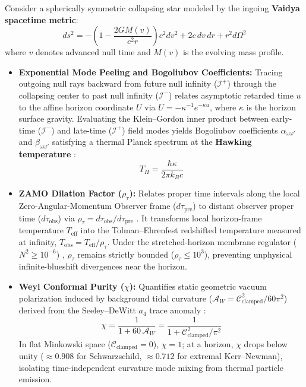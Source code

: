 \documentclass[11pt,a4paper]{article}
\begin{document}
Consider a spherically symmetric collapsing star modeled by the ingoing \textbf{Vaidya spacetime metric}:
\begin{equation}
ds^2 = -\left(1 - \frac{2GM(v)}{c^2 r}\right) c^2 dv^2 + 2c\, dv\, dr + r^2 d\Omega^2
\end{equation}
where $v$ denotes advanced null time and $M(v)$ is the evolving mass profile.

\begin{itemize}
\item \textbf{Exponential Mode Peeling and Bogoliubov Coefficients:} Tracing outgoing null rays backward from future null infinity ($\mathcal{I}^+$) through the collapsing center to past null infinity ($\mathcal{I}^-$) relates asymptotic retarded time $u$ to the affine horizon coordinate $U$ via $U = -\kappa^{-1} e^{-\kappa u}$, where $\kappa$ is the horizon surface gravity. Evaluating the Klein--Gordon inner product between early-time ($\mathcal{I}^-$) and late-time ($\mathcal{I}^+$) field modes yields Bogoliubov coefficients $\alpha_{\omega\omega'}$ and $\beta_{\omega\omega'}$ satisfying a thermal Planck spectrum at the \textbf{Hawking temperature} \cite{Hawking1975}:
\begin{equation}
T_H = \frac{\hbar \kappa}{2\pi k_B c}
\end{equation}

\item \textbf{ZAMO Dilation Factor ($\rho_\tau$):} Relates proper time intervals along the local Zero-Angular-Momentum Observer frame ($d\tau_{\text{pre}}$) to distant observer proper time ($d\tau_{\text{obs}}$) via $\rho_\tau = d\tau_{\text{obs}} / d\tau_{\text{pre}}$ \cite{ADM1962,BPT1972}. It transforms local horizon-frame temperature $T_{\text{eff}}$ into the Tolman--Ehrenfest redshifted temperature measured at infinity, $T_{\text{obs}} = T_{\text{eff}} / \rho_\tau$. Under the stretched-horizon membrane regulator ($N^2 \ge 10^{-6}$) \cite{TPM1986}, $\rho_\tau$ remains strictly bounded ($\rho_\tau \le 10^3$), preventing unphysical infinite-blueshift divergences near the horizon.

\item \textbf{Weyl Conformal Purity ($\chi$):} Quantifies static geometric vacuum polarization induced by background tidal curvature ($\mathcal{A}_W = \mathcal{C}_{\text{clamped}}^2 / 60\pi^2$) derived from the Seeley--DeWitt $a_4$ trace anomaly \cite{DeWitt1965}:
\begin{equation}
\chi = \frac{1}{1 + 60\,\mathcal{A}_W} = \frac{1}{1 + \mathcal{C}_{\text{clamped}}^2 / \pi^2}
\end{equation}
In flat Minkowski space ($\mathcal{C}_{\text{clamped}} = 0$), $\chi = 1$; at a horizon, $\chi$ drops below unity ($\approx 0.908$ for Schwarzschild, $\approx 0.712$ for extremal Kerr--Newman), isolating time-independent curvature mode mixing from thermal particle emission.
\end{itemize}
\end{document}
